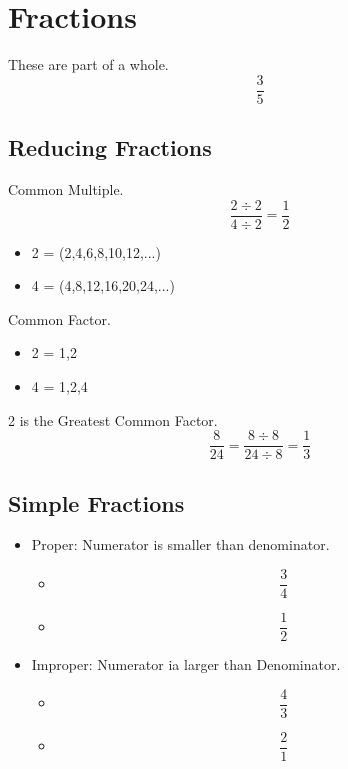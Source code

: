\documentclass[]{article}
\begin{document}
\section{Fractions}
These are part of a whole.
\begin{equation*}
	\frac {3}{5} 
\end{equation*}


\subsection{Reducing Fractions}
Common Multiple.
\begin{equation}
	\frac {2 \div 2}{4 \div 2} = \frac{1}{2}
\end{equation}
	\begin{itemize}
		\item 2 = (2,4,6,8,10,12,...)
		\item 4 = (4,8,12,16,20,24,...)
	\end{itemize}
Common Factor.
	\begin{itemize}
		\item 2 = 1,2
		\item 4 = 1,2,4
	\end{itemize}
		2 is the Greatest Common Factor.
\begin{equation}
\frac {8}{24} = \frac {8 \div 8}{24 \div 8} = \frac {1}{3}
\end{equation}


\subsection{Simple Fractions}
\begin{itemize}
	\item Proper: Numerator is smaller than denominator. 
	\begin{itemize}
		\item \begin{equation*}
			\frac{3}{4} 
		\end{equation*}
		\item \begin{equation*}
			\frac{1}{2}
		\end{equation*}
	\end{itemize}
	\item Improper: Numerator ia larger than Denominator. 
		\begin{itemize}
			\item \begin{equation*}
			\frac{4}{3} 
			\end{equation*}
			\item \begin{equation*}
			\frac{2}{1}
			\end{equation*}
		\end{itemize}
\end{itemize}
\end{document}
